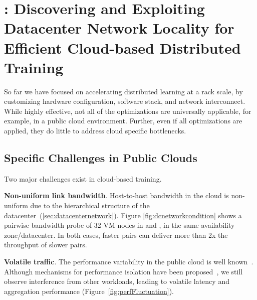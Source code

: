 \chapter{\plink: Discovering and Exploiting Datacenter Network Locality for Efficient Cloud-based Distributed Training}

So far we have focused on accelerating distributed learning at a rack scale, by customizing hardware configuration, software stack, and network interconnect. While highly effective, not all of the optimizations are universally applicable, for example, in a public cloud environment. Further, even if all optimizations are applied, they do little to address cloud specific bottlenecks.

\section{Specific Challenges in Public Clouds}
Two major challenges exist in cloud-based training.

\noindent\textbf{Non-uniform link bandwidth}. Host-to-host bandwidth in the cloud is non-uniform due to the hierarchical structure of the datacenter~(\textsection \ref{sec:datacenternetwork}). %
Figure \ref{fig:dcnetworkcondition} shows a pairwise bandwidth probe of 32 VM nodes in \ectwo and \azure, in the same availability zone/datacenter. In both cases, faster pairs can deliver more than 2x the throughput of slower pairs. %


\noindent\textbf{Volatile traffic}. The performance variability in the public cloud is well known~\cite{cloudVariance1, Iosup:2011:PVP:2007336.2007402,perfVariance}. Although mechanisms for performance isolation have been proposed~\cite{Shieh:2010:SPI:1863103.1863104,Shieh:2011:SDC:1972457.1972489}, we still observe interference from other workloads, leading to volatile latency and aggregation performance (Figure~\ref{fig:perfFluctuation}).

